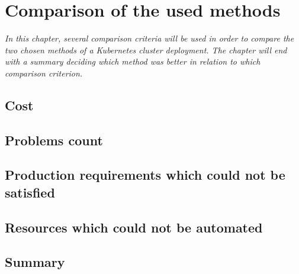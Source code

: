 \section{Comparison of the used methods}
\textit{In this chapter, several comparison criteria will be used in order to compare the two chosen methods of a Kubernetes cluster deployment. The chapter will end with a summary deciding which method was better in relation to which comparison criterion.}
\subsection{Cost}
\subsection{Problems count}
\subsection{Production requirements which could not be satisfied}
\subsection{Resources which could not be automated}
\subsection{Summary}
